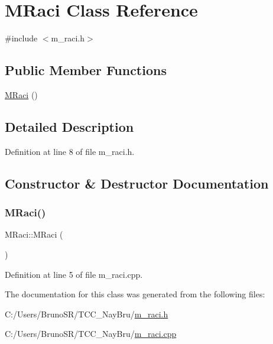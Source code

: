 \hypertarget{class_m_raci}{}\section{M\+Raci Class Reference}
\label{class_m_raci}


{\ttfamily \#include $<$m\+\_\+raci.\+h$>$}

\subsection*{Public Member Functions}
\begin{DoxyCompactItemize}
\item 
\hyperlink{class_m_raci_a62c738f5cf78b52066d235d7d159afe8}{M\+Raci} ()
\end{DoxyCompactItemize}


\subsection{Detailed Description}


Definition at line 8 of file m\+\_\+raci.\+h.



\subsection{Constructor \& Destructor Documentation}
\hypertarget{class_m_raci_a62c738f5cf78b52066d235d7d159afe8}{}\label{class_m_raci_a62c738f5cf78b52066d235d7d159afe8} 
\subsubsection{\texorpdfstring{M\+Raci()}{MRaci()}}
{\footnotesize\ttfamily M\+Raci\+::\+M\+Raci (\begin{DoxyParamCaption}{ }\end{DoxyParamCaption})}



Definition at line 5 of file m\+\_\+raci.\+cpp.



The documentation for this class was generated from the following files\+:\begin{DoxyCompactItemize}
\item 
C\+:/\+Users/\+Bruno\+S\+R/\+T\+C\+C\+\_\+\+Nay\+Bru/\hyperlink{m__raci_8h}{m\+\_\+raci.\+h}\item 
C\+:/\+Users/\+Bruno\+S\+R/\+T\+C\+C\+\_\+\+Nay\+Bru/\hyperlink{m__raci_8cpp}{m\+\_\+raci.\+cpp}\end{DoxyCompactItemize}
